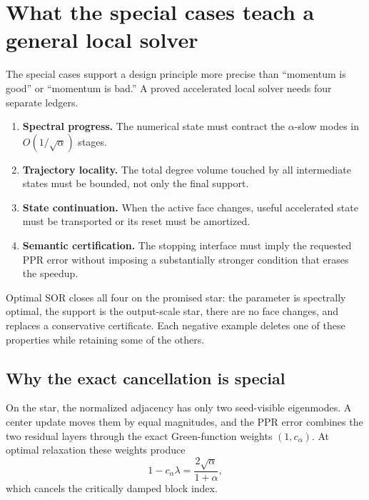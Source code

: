 \section{What the special cases teach a general local solver}
\label{sec:signed-star-general-lessons}

The special cases support a design principle more precise than ``momentum is
good'' or ``momentum is bad.''  A proved accelerated local solver needs four
separate ledgers.

\begin{enumerate}[leftmargin=*]
\item \textbf{Spectral progress.}  The numerical state must contract the
      $\alpha$-slow modes in $O(1/\sqrt\alpha)$ stages.
\item \textbf{Trajectory locality.}  The total degree volume touched by all
      intermediate states must be bounded, not only the final support.
\item \textbf{State continuation.}  When the active face changes, useful
      accelerated state must be transported or its reset must be amortized.
\item \textbf{Semantic certification.}  The stopping interface must imply the
      requested PPR error without imposing a substantially stronger condition
      that erases the speedup.
\end{enumerate}

Optimal SOR closes all four on the promised star: the parameter is spectrally
optimal, the support is the output-scale star, there are no face changes, and
 replaces a conservative certificate.
Each negative example deletes one of these properties while retaining some of
the others.

\subsection{Why the exact cancellation is special}

On the star, the normalized adjacency has only two seed-visible eigenmodes.
A center update moves them by equal magnitudes, and the PPR error combines the
two residual layers through the exact Green-function weights
$(1,c_\alpha)$.  At optimal relaxation these weights produce
\begin{equation}
  1-c_\alpha\lambda
  =\frac{2\sqrt\alpha}{1+\alpha},
  \label{eq:signed-star-special-cancellation}
\end{equation}
which cancels the critically damped block index.

